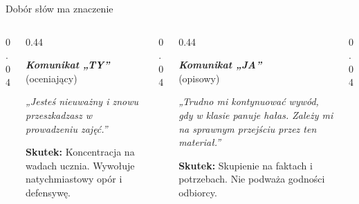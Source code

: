 \documentclass[10pt, aspectratio=169]{beamer}
\begin{document}
\begin{frame}{Dobór słów ma znaczenie}
    \vspace{0.6cm}
    \begin{columns}[T]
        \begin{column}{0.04\textwidth}
        \end{column}
        
        \begin{column}{0.44\textwidth}
            \begin{center}
                {\Large\rmfamily\itshape\bfseries\textcolor{accentCoral}{Komunikat „TY”}}\\[0.1cm]
                {\footnotesize\textcolor{textMuted}{(oceniający)}}
            \end{center}
            \vspace{0.4cm}
            
            \begin{center}
                \textit{\small „Jesteś nieuważny i znowu przeszkadzasz w prowadzeniu zajęć.”}
            \end{center}
            \vspace{0.4cm}
            
            \footnotesize \textbf{\textcolor{accentCoral}{Skutek:}} Koncentracja na wadach ucznia. Wywołuje natychmiastowy opór i defensywę.
        \end{column}
        
        \begin{column}{0.04\textwidth}
        \end{column}
        
        \begin{column}{0.44\textwidth}
            \begin{center}
                {\Large\rmfamily\itshape\bfseries\textcolor{accentTeal}{Komunikat „JA”}}\\[0.1cm]
                {\footnotesize\textcolor{textMuted}{(opisowy)}}
            \end{center}
            \vspace{0.4cm}
            
            \begin{center}
                \textit{\small „Trudno mi kontynuować wywód, gdy w klasie panuje hałas. Zależy mi na sprawnym przejściu przez ten materiał.”}
            \end{center}
            \vspace{0.15cm}
            
            \footnotesize \textbf{\textcolor{accentTeal}{Skutek:}} Skupienie na faktach i potrzebach. Nie podważa godności odbiorcy.
        \end{column}
        
        \begin{column}{0.04\textwidth}
        \end{column}
    \end{columns}
\end{frame}
\end{document}
